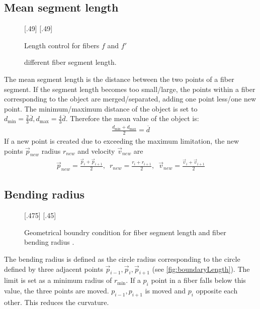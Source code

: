 \subsection{Mean segment length}
% 
\begin{figure}[!t]
    \centering
    \setlength{\tikzwidth}{.45\textwidth}
    [.49\textwidth]{
    }
    [.49\textwidth]{
    }
	\caption{Length control for fibers $f$ and $f'$}
	\label{fig:mergeSplit}
\end{figure}
% 
% 
\begin{figure}[!t]
    \centering
    \setlength{\tikzwidth}{0.75\textwidth}
    \tikzset{external/export next=false}
	\caption{different fiber segment length.}
	\label{fig:modelLength}
\end{figure}
% 
The mean segment length is the distance between the two points of a fiber segment.
If the segment length becomes too small/large, the points within a fiber corresponding to the object are merged/separated, adding one point less/one new point.
The minimum/maximum distance of the object is set to $d_{\min} = \frac{2}{3} \overline{d}, d_{\max} = \frac{4}{3}\overline{d}$.
Therefore the mean value of the object is:
\begin{align}
\frac{d_{\min} + d_{\max}}{2} = \overline{d}
\end{align}
% 
If a new point is created due to exceeding the maximum limitation, the new points $\vec{p}_{new}$ radius $r_{new}$ and velocity $\vec{v}_{new}$ are 
\begin{align}
\vec{p}_{new} = \frac{\vec{p}_{i} + \vec{p}_{i+1}}{2},\enspace
r_{new} = \frac{r_{i} + r_{i+1}}{2},\enspace
\vec{v}_{new} = \frac{\vec{v}_{i} + \vec{v}_{i+1}}{2}
\end{align}
% 
\subsection{Bending radius}
% 
\begin{figure}[!t]
    \centering
    \def\tikzheight{.40\textwidth}
    [.475\textwidth]{
    }\hfill
    [.45\textwidth]{
    }
	\caption{Geometrical boundry condition for fiber segment length \segLength and fiber bending radius \segRadius.}
	\label{fig:modelCircle}
\end{figure}
% 
The bending radius is defined as the circle radius corresponding to the circle defined by three adjacent points $\vec{p}_{i-1}, \vec{p}_{i}, \vec{p}_{i+1}$ (see \cref{fig:boundaryLength}). 
The limit is set as a minimum radius of $r_{\min}$.
If a $p_{i}$ point in a fiber falls below this value, the three points are moved.
$p_{i-1},p_{i+1}$ is moved \dummy{} and $p_{i}$ opposite each other.
This reduces the curvature.
% 
